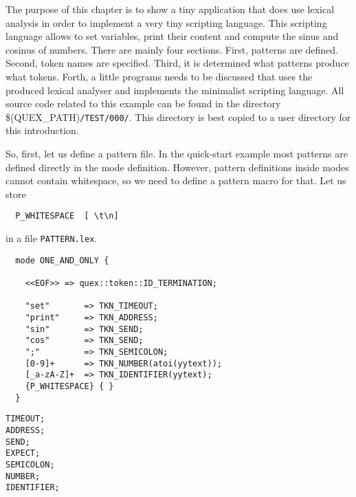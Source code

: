 The purpose of this chapter is to show a tiny application that does use
lexical analysis in order to implement a very tiny scripting language. This
scripting language allows to set variables, print their content and compute
the sinus and cosinus of numbers. There are mainly four sections. First,
patterns are defined. Second, token names are specified. Third, it is
determined what patterns produce what tokens. Forth, a little programs needs
to be discussed that uses the produced lexical analyser and implements the
minimalist scripting language. All source code related to this example can be
found in the directory \$(QUEX\_PATH){\tt /TEST/000/}.  This directory is best
copied to a user directory for this introduction.

So, first, let us define a pattern file. In the quick-start example most
patterns are defined directly in the mode definition. However, pattern
definitions inside modes cannot contain whitespace, so we need to 
define a pattern macro for that. Let us store 

\begin{lstlisting}
  P_WHITESPACE  [ \t\n]
\end{lstlisting}

in a file {\tt PATTERN.lex}.


\begin{lstlisting}
  mode ONE_AND_ONLY { 

    <<EOF>> => quex::token::ID_TERMINATION;

    "set"       => TKN_TIMEOUT;
    "print"     => TKN_ADDRESS;
    "sin"       => TKN_SEND;
    "cos"       => TKN_SEND;
    ";"         => TKN_SEMICOLON;
    [0-9]+      => TKN_NUMBER(atoi(yytext));
    [_a-zA-Z]+  => TKN_IDENTIFIER(yytext);
    {P_WHITESPACE} { }
  }
\end{lstlisting}


\begin{lstlisting}
TIMEOUT;
ADDRESS;
SEND;
EXPECT;
SEMICOLON;
NUMBER;
IDENTIFIER;
\end{lstlisting}
